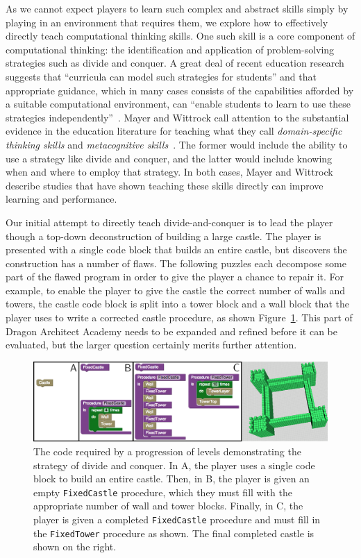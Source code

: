 \documentclass{sig-alternate}
\newcommand{\gametitle}{{\color{RoyalPurple} Dragon Architect Academy}}
\begin{document}
As we cannot expect players to learn such complex and abstract skills simply by playing in an environment that requires them, we explore how to effectively directly teach computational thinking skills.
One such skill is a core component of computational thinking: the identification and application of problem-solving strategies such as divide and conquer.
A great deal of recent education research suggests that ``curricula can model such strategies for students'' and that appropriate guidance, which in many cases consists of the capabilities afforded by a suitable computational environment, can ``enable students to learn to use these strategies independently''~\cite{report2010computational}.
Mayer and Wittrock call attention to the substantial evidence in the education literature for teaching what they call \emph{domain-specific thinking skills} and \emph{metacognitive skills}~\cite{mayer1996handbook}.
The former would include the ability to use a strategy like divide and conquer, and the latter would include knowing when and where to employ that strategy.
In both cases, Mayer and Wittrock describe studies that have shown teaching these skills directly can improve learning and performance.

Our initial attempt to directly teach divide-and-conquer is to lead the player though a top-down deconstruction of building a large castle.
The player is presented with a single code block that builds an entire castle, but discovers the construction has a number of flaws. 
The following puzzles each decompose some part of the flawed program in order to give the player a chance to repair it. 
For example, to enable the player to give the castle the correct number of walls and towers, the castle code block is split into a tower block and a wall block that the player uses to write a corrected castle procedure, as shown Figure~\ref{fig:decomp}. 
This part of \gametitle{} needs to be expanded and refined before it can be evaluated, but the larger question certainly merits further attention. 

\begin{figure}[th!]
  \centering
  \includegraphics[width=\textwidth]{images/decomp-code}
  \caption{The code required by a progression of levels demonstrating the strategy of divide and conquer. In A, the player uses a single code block to build an entire castle. Then, in B, the player is given an empty \texttt{FixedCastle} procedure, which they must fill with the appropriate number of wall and tower blocks. Finally, in C, the player is given a completed \texttt{FixedCastle} procedure and must fill in the \texttt{FixedTower} procedure as shown. The final completed castle is shown on the right.}
  \label{fig:decomp}
\end{figure}
\end{document}

